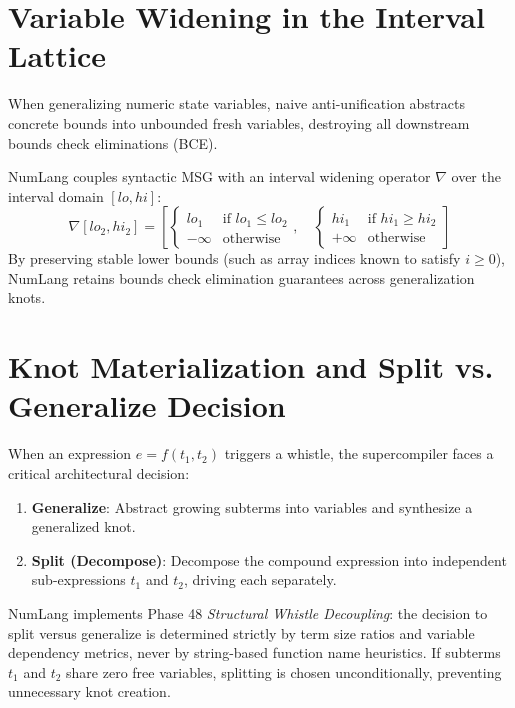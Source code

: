 \section{Variable Widening in the Interval Lattice}
\label{sec:generalization:widening}

When generalizing numeric state variables, naive anti-unification abstracts concrete bounds into unbounded fresh variables, destroying all downstream bounds check eliminations (BCE). 

NumLang couples syntactic MSG with an interval widening operator $\nabla$ over the interval domain $[lo, hi]$:
\begin{equation}
[lo_1, hi_1] \nabla [lo_2, hi_2] = \left[
\begin{cases}
lo_1 & \text{if } lo_1 \le lo_2 \\
-\infty & \text{otherwise}
\end{cases}, \quad
\begin{cases}
hi_1 & \text{if } hi_1 \ge hi_2 \\
+\infty & \text{otherwise}
\end{cases}
\right]
\end{equation}
By preserving stable lower bounds (such as array indices known to satisfy $i \ge 0$), NumLang retains bounds check elimination guarantees across generalization knots.

\section{Knot Materialization and Split vs. Generalize Decision}
\label{sec:generalization:split}

When an expression $e = f(t_1, t_2)$ triggers a whistle, the supercompiler faces a critical architectural decision:
\begin{enumerate}
    \item \textbf{Generalize}: Abstract growing subterms into variables and synthesize a generalized knot.
    \item \textbf{Split (Decompose)}: Decompose the compound expression into independent sub-expressions $t_1$ and $t_2$, driving each separately.
\end{enumerate}

NumLang implements Phase 48 \emph{Structural Whistle Decoupling}: the decision to split versus generalize is determined strictly by term size ratios and variable dependency metrics, never by string-based function name heuristics. If subterms $t_1$ and $t_2$ share zero free variables, splitting is chosen unconditionally, preventing unnecessary knot creation.

